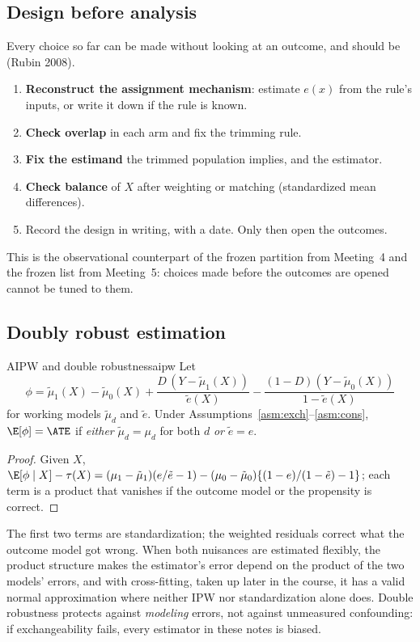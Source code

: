 \documentclass[11pt]{article}
\begin{document}
\subsection{Design before analysis}

Every choice so far can be made without looking at an outcome, and should be (Rubin 2008).
\begin{enumerate}
  \item \textbf{Reconstruct the assignment mechanism}: estimate $e(x)$ from the rule's inputs, or write it down if the rule is
  known.
  \item \textbf{Check overlap} in each arm and fix the trimming rule.
  \item \textbf{Fix the estimand} the trimmed population implies, and the estimator.
  \item \textbf{Check balance} of $X$ after weighting or matching (standardized mean differences).
  \item Record the design in writing, with a date. Only then open the outcomes.
\end{enumerate}
This is the observational counterpart of the frozen partition from Meeting~4 and the frozen list from Meeting~5: choices
made before the outcomes are opened cannot be tuned to them.

\subsection{Doubly robust estimation}

\begin{prop}{AIPW and double robustness}{aipw}
Let
\[
  \phi = \tilde\mu_1(X) - \tilde\mu_0(X) + \frac{D\,(Y - \tilde\mu_1(X))}{\tilde e(X)} - \frac{(1-D)(Y - \tilde\mu_0(X))}{1 - \tilde e(X)}
\]
for working models $\tilde\mu_d$ and $\tilde e$. Under Assumptions~\ref{asm:exch}--\ref{asm:cons}, $\E[\phi] = \ATE$ if \emph{either}
$\tilde\mu_d = \mu_d$ for both $d$ \emph{or} $\tilde e = e$.
\end{prop}
\begin{proof}
Given $X$, $\E[\phi \mid X] - \tau(X) = (\mu_1 - \tilde\mu_1)(e/\tilde e - 1) - (\mu_0 - \tilde\mu_0)\{(1-e)/(1-\tilde e) - 1\}$; each term is a
product that vanishes if the outcome model or the propensity is correct.
\end{proof}

The first two terms are standardization; the weighted residuals correct what the outcome model got wrong. When both nuisances
are estimated flexibly, the product structure makes the estimator's error depend on the product of the two models' errors, and
with cross-fitting, taken up later in the course, it has a valid normal approximation where neither IPW nor standardization alone does. Double
robustness protects against \emph{modeling} errors, not against unmeasured confounding: if exchangeability fails, every
estimator in these notes is biased.
\end{document}
